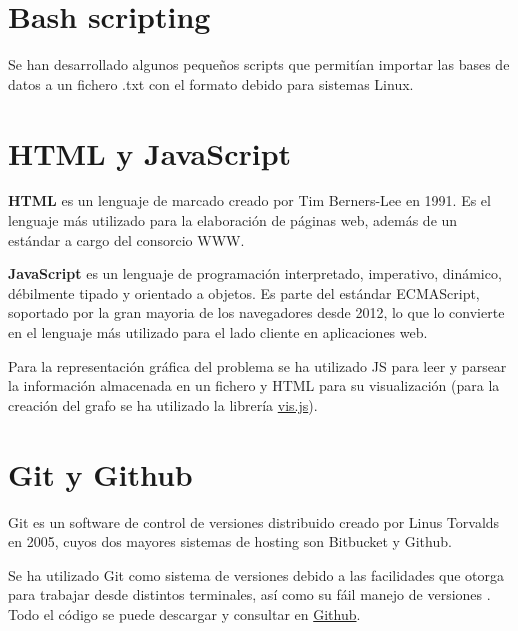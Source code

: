\section{Bash scripting}
Se han desarrollado algunos pequeños scripts que permitían importar las bases de datos a un fichero .txt con el formato debido para sistemas Linux. 

\section{HTML y JavaScript}
\textbf{HTML} es un lenguaje de marcado  creado por Tim Berners-Lee en 1991. Es el lenguaje más utilizado para la elaboración de páginas web, además de un estándar a cargo del consorcio WWW.

\textbf{JavaScript} es un lenguaje de programación interpretado, imperativo, dinámico, débilmente tipado y  orientado a objetos. Es parte del estándar ECMAScript, soportado por la gran mayoria de los navegadores desde 2012, lo que lo convierte en el lenguaje más utilizado para el lado cliente en aplicaciones web.

Para la representación gráfica del problema se ha utilizado JS para leer y parsear la información almacenada en un fichero y HTML para su visualización (para la creación del grafo se ha utilizado la librería \href{http://visjs.org/docs/network/}{vis.js}).

\section{Git y Github}
Git es un software de control de versiones distribuido creado por Linus Torvalds en 2005, cuyos dos mayores sistemas de hosting son Bitbucket y Github.

Se ha utilizado Git como sistema de versiones debido a las facilidades que otorga para trabajar desde distintos terminales, así como su fáil manejo de versiones . Todo el código se puede descargar y consultar en  \href{https://github.com/cavasanchez/TFG}{Github}.

